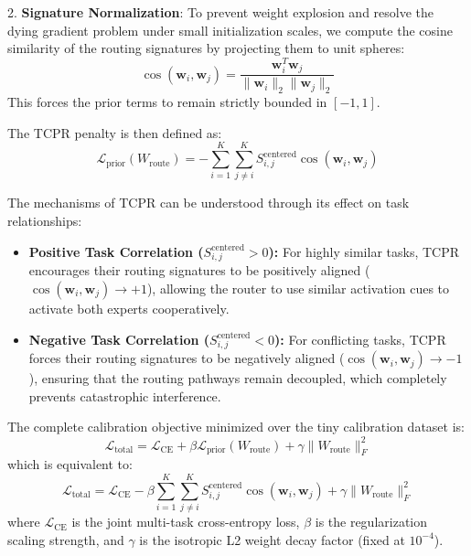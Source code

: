 2. \textbf{Signature Normalization}: To prevent weight explosion and resolve the dying gradient problem under small initialization scales, we compute the cosine similarity of the routing signatures by projecting them to unit spheres:
\begin{equation}
    \cos(\mathbf{w}_i, \mathbf{w}_j) = \frac{\mathbf{w}_i^T \mathbf{w}_j}{\|\mathbf{w}_i\|_2 \|\mathbf{w}_j\|_2}
\end{equation}
This forces the prior terms to remain strictly bounded in $[-1, 1]$.

The TCPR penalty is then defined as:
\begin{equation}
    \mathcal{L}_{\text{prior}}(W_{\text{route}}) = - \sum_{i=1}^K \sum_{j \ne i}^K S^{\text{centered}}_{i, j} \cos(\mathbf{w}_i, \mathbf{w}_j)
\end{equation}

The mechanisms of TCPR can be understood through its effect on task relationships:
\begin{itemize}
    \item \textbf{Positive Task Correlation ($S^{\text{centered}}_{i, j} > 0$):} For highly similar tasks, TCPR encourages their routing signatures to be positively aligned ($\cos(\mathbf{w}_i, \mathbf{w}_j) \to +1$), allowing the router to use similar activation cues to activate both experts cooperatively.
    \item \textbf{Negative Task Correlation ($S^{\text{centered}}_{i, j} < 0$):} For conflicting tasks, TCPR forces their routing signatures to be negatively aligned ($\cos(\mathbf{w}_i, \mathbf{w}_j) \to -1$), ensuring that the routing pathways remain decoupled, which completely prevents catastrophic interference.
\end{itemize}

The complete calibration objective minimized over the tiny calibration dataset is:
\begin{equation}
    \mathcal{L}_{\text{total}} = \mathcal{L}_{\text{CE}} + \beta \mathcal{L}_{\text{prior}}(W_{\text{route}}) + \gamma \|W_{\text{route}}\|_F^2
\end{equation}
which is equivalent to:
\begin{equation}
    \mathcal{L}_{\text{total}} = \mathcal{L}_{\text{CE}} - \beta \sum_{i=1}^K \sum_{j \ne i}^K S^{\text{centered}}_{i, j} \cos(\mathbf{w}_i, \mathbf{w}_j) + \gamma \|W_{\text{route}}\|_F^2
\end{equation}
where $\mathcal{L}_{\text{CE}}$ is the joint multi-task cross-entropy loss, $\beta$ is the regularization scaling strength, and $\gamma$ is the isotropic L2 weight decay factor (fixed at $10^{-4}$).

